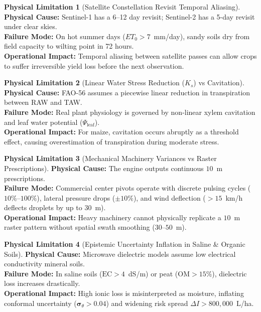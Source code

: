 \documentclass[11pt,a4paper]{article}
\theoremstyle{definition}
\newtheorem{limitation}{Physical Limitation}[section]
\theoremstyle{remark}
\begin{document}
\begin{limitation}[Satellite Constellation Revisit Temporal Aliasing]
\textbf{Physical Cause:} Sentinel-1 has a 6--12 day revisit; Sentinel-2 has a 5-day revisit under clear skies. \\
\textbf{Failure Mode:} On hot summer days ($ET_0 > 7$~mm/day), sandy soils dry from field capacity to wilting point in 72 hours. \\
\textbf{Operational Impact:} Temporal aliasing between satellite passes can allow crops to suffer irreversible yield loss before the next observation.
\end{limitation}

\begin{limitation}[Linear Water Stress Reduction ($K_s$) vs Cavitation]
\textbf{Physical Cause:} FAO-56 assumes a piecewise linear reduction in transpiration between RAW and TAW. \\
\textbf{Failure Mode:} Real plant physiology is governed by non-linear xylem cavitation and leaf water potential ($\Psi_{\text{leaf}}$). \\
\textbf{Operational Impact:} For maize, cavitation occurs abruptly as a threshold effect, causing overestimation of transpiration during moderate stress.
\end{limitation}

\begin{limitation}[Mechanical Machinery Variances vs Raster Prescriptions]
\textbf{Physical Cause:} The engine outputs continuous $10$~m prescriptions. \\
\textbf{Failure Mode:} Commercial center pivots operate with discrete pulsing cycles ($10\%$--$100\%$), lateral pressure drops ($\pm 10\%$), and wind deflection ($> 15$~km/h deflects droplets by up to $30$~m). \\
\textbf{Operational Impact:} Heavy machinery cannot physically replicate a $10$~m raster pattern without spatial swath smoothing ($30$--$50$~m).
\end{limitation}

\begin{limitation}[Epistemic Uncertainty Inflation in Saline \& Organic Soils]
\textbf{Physical Cause:} Microwave dielectric models assume low electrical conductivity mineral soils. \\
\textbf{Failure Mode:} In saline soils ($\text{EC} > 4$~dS/m) or peat ($\text{OM} > 15\%$), dielectric loss increases drastically. \\
\textbf{Operational Impact:} High ionic loss is misinterpreted as moisture, inflating conformal uncertainty ($\boldsymbol{\sigma}_{\theta} > 0.04$) and widening risk spread $\Delta I > 800,000$~L/ha.
\end{limitation}
\end{document}

